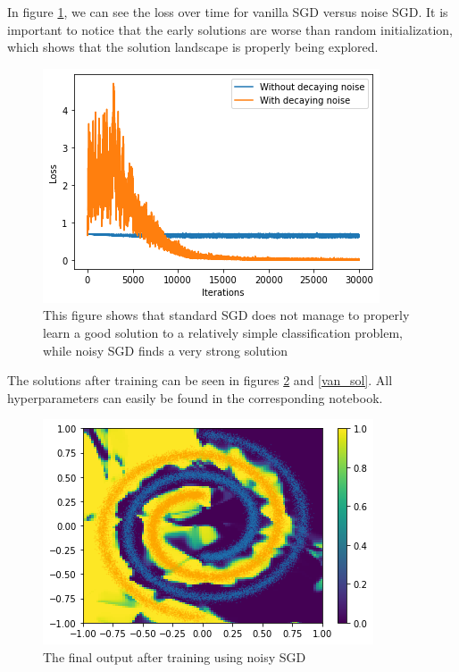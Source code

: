 \documentclass[twocolumn]{article}
\begin{document}
In figure \ref{loss}, we can see the loss over time for vanilla SGD versus noise SGD. It is important to notice that the early solutions are worse than random initialization, which shows that the solution landscape is properly being explored.

\begin{figure}[ht!]
\begin{center}
  \centerline{\includegraphics[width=\columnwidth]{src/loss.png}}
  \caption{This figure shows that standard SGD does not manage to properly learn a good solution to a relatively simple classification problem, while noisy SGD finds a very strong solution}
  \label{loss}
\end{center}
\vskip -0.2in
\end{figure}

The solutions after training can be seen in figures \ref{noisy_sol} and \ref{van_sol}. All hyperparameters can easily be found in the corresponding notebook.

\begin{figure}[ht!]
\begin{center}
  \centerline{\includegraphics[width=\columnwidth]{src/noise_sol.png}}
  \caption{The final output after training using noisy SGD}
  \label{noisy_sol}
\end{center}
\vskip -0.2in
\end{figure}
\end{document}
